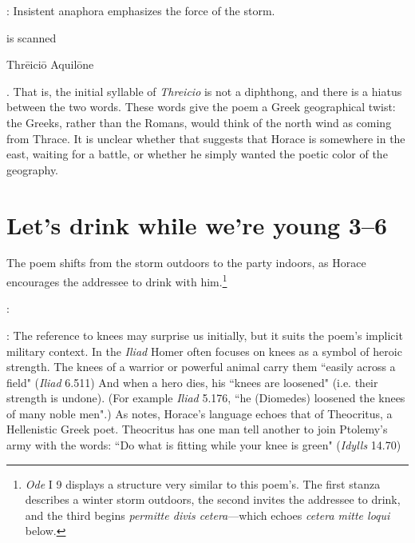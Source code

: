: Insistent anaphora emphasizes the force of the storm.


 is scanned \begin{metrica}Thr\=e\-ic\-i\=o \-Aqu\-il\=on\-e\end{metrica}.  That is, the initial syllable of \textit{Threicio} is not a diphthong, and there is a hiatus between the two words.  These words give the poem a Greek geographical twist: the Greeks, rather than the Romans, would think of the north wind as coming from Thrace.  It is unclear whether that suggests that Horace is somewhere in the east, waiting for a battle, or whether he simply wanted the poetic color of the geography.


\section*{Let's drink while we're young 3--6}

The poem shifts from the storm outdoors to the party indoors, as Horace encourages the addressee to drink with him.\footnote{\textit{Ode} I 9 displays a structure very similar to this poem's.  The first stanza describes a winter storm outdoors, the second invites the addressee to drink, and the third begins \textit{permitte divis cetera}---which echoes \textit{cetera mitte loqui} below.}


: 


: The reference to knees may surprise us initially, but it suits the poem's implicit military context.  In the \textit{Iliad} Homer often focuses on knees as a symbol of heroic strength.  The knees of a warrior or powerful animal carry them ``easily across a field" (\textit{Iliad} 6.511)  And when a hero dies, his ``knees are loosened" (i.e. their strength is undone).  (For example \textit{Iliad} 5.176, ``he (Diomedes) loosened the knees of many noble men".)  As \citet[216--217]{mankin1995} notes, Horace's language echoes that of Theocritus, a Hellenistic Greek poet. Theocritus has one man tell another to join Ptolemy's army with the words: ``Do what is fitting while your knee is green" (\textit{Idylls} 14.70)


